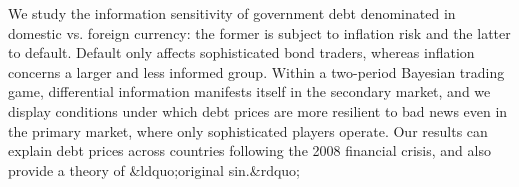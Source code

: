 We study the information sensitivity of government debt denominated in domestic vs. foreign currency: the former is subject to inflation risk and the latter to default. Default only affects sophisticated bond traders, whereas inflation concerns a larger and less informed group. Within a two-period Bayesian trading game, differential information manifests itself in the secondary market, and we display conditions under which debt prices are more resilient to bad news even in the primary market, where only sophisticated players operate. Our results can explain debt prices across countries following the 2008 financial crisis, and also provide a theory of &ldquo;original sin.&rdquo;